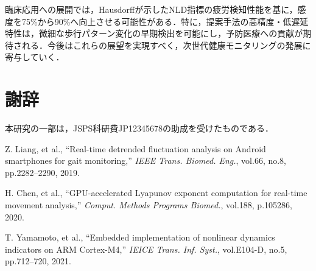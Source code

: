 \documentclass[paper]{ieicej}
\begin{document}
臨床応用への展開では，Hausdorff\cite{hausdorff2009}が示したNLD指標の疲労検知性能を基に，感度を75\%から90\%へ向上させる可能性がある．特に，提案手法の高精度・低遅延特性は，微細な歩行パターン変化の早期検出を可能にし，予防医療への貢献が期待される．今後はこれらの展望を実現すべく，次世代健康モニタリングの発展に寄与していく．

\section*{謝辞}
本研究の一部は，JSPS科研費JP12345678の助成を受けたものである．

Z. Liang, et al., ``Real-time detrended fluctuation analysis on Android smartphones for gait monitoring,'' \textit{IEEE Trans. Biomed. Eng.}, vol.66, no.8, pp.2282--2290, 2019.

H. Chen, et al., ``GPU-accelerated Lyapunov exponent computation for real-time movement analysis,'' \textit{Comput. Methods Programs Biomed.}, vol.188, p.105286, 2020.

T. Yamamoto, et al., ``Embedded implementation of nonlinear dynamics indicators on ARM Cortex-M4,'' \textit{IEICE Trans. Inf. Syst.}, vol.E104-D, no.5, pp.712--720, 2021.
\end{document}
